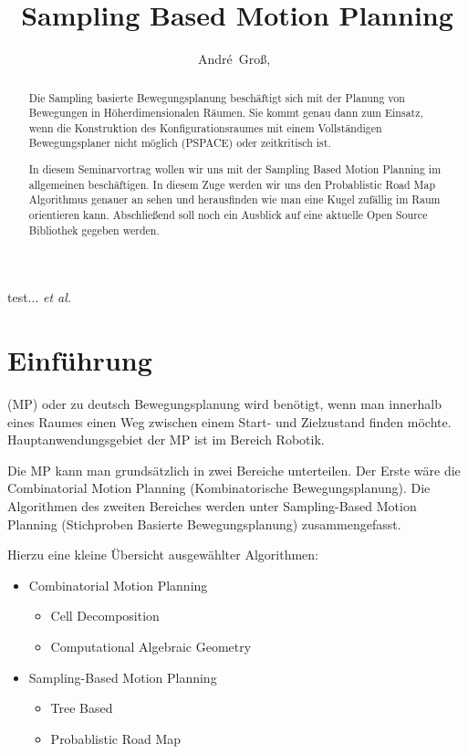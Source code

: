 \documentclass[journal]{IEEEtran}
\begin{document}
\title{Sampling Based Motion Planning}
\author{André~Groß,~}%
%
{test... \MakeLowercase{\textit{et al.}}}

\maketitle


\begin{abstract}
Die Sampling basierte Bewegungsplanung beschäftigt sich mit der Planung von Bewegungen in Höherdimensionalen Räumen. Sie kommt genau dann zum Einsatz, wenn die Konstruktion des Konfigurationsraumes mit einem Vollständigen Bewegungsplaner nicht möglich (PSPACE) oder zeitkritisch ist.

In diesem Seminarvortrag wollen wir uns mit der Sampling Based Motion Planning im allgemeinen beschäftigen. In diesem Zuge werden wir uns den Probablistic Road Map Algorithmus genauer an sehen und herausfinden wie man eine Kugel zufällig im Raum orientieren kann.
Abschließend soll noch ein Ausblick auf eine aktuelle Open Source Bibliothek gegeben werden.
\end{abstract}

\IEEEpeerreviewmaketitle



\section{Einführung}
 (MP) oder zu deutsch Bewegungsplanung wird benötigt, wenn man innerhalb eines Raumes einen Weg zwischen einem Start- und Zielzustand finden möchte.
Hauptanwendungsgebiet der MP ist im Bereich Robotik.

Die MP kann man grundsätzlich in zwei Bereiche unterteilen. Der Erste wäre die Combinatorial Motion Planning (Kombinatorische Bewegungsplanung). Die Algorithmen des zweiten Bereiches werden unter Sampling-Based Motion Planning (Stichproben Basierte Bewegungsplanung) zusammengefasst.

Hierzu eine kleine Übersicht ausgewählter Algorithmen:
\begin{itemize}
\item Combinatorial Motion Planning
\begin{itemize}
\item Cell Decomposition
\item Computational Algebraic Geometry
\end{itemize}
\item Sampling-Based Motion Planning
\begin{itemize}
\item Tree Based
\item Probablistic Road Map
\end{itemize}
\end{itemize}
\cite{lavalle06}
\cite{arvo00}
\cite{tsk07}
\end{document}
